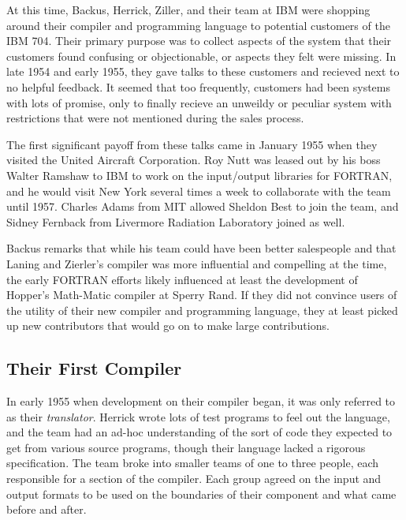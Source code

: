 At this time, Backus, Herrick, Ziller, and their team at IBM were shopping around
their compiler and programming language to potential customers of the IBM 704.
Their primary purpose was to collect aspects of the system that their customers found
confusing or objectionable, or aspects they felt were missing.
In late 1954 and early 1955, they gave talks to these customers and recieved next to
no helpful feedback.
It seemed that too frequently, customers had been systems with lots of promise, only to
finally recieve an unweildy or peculiar system with restrictions that were not mentioned
during the sales process.

The first significant payoff from these talks came in January 1955 when they visited the
United Aircraft Corporation. Roy Nutt was leased out by his boss Walter Ramshaw
to IBM to work on the input/output
libraries for FORTRAN, and he would visit New York several times a week to collaborate with
the team until 1957.
Charles Adams from MIT allowed Sheldon Best to join the team,
and Sidney Fernback from Livermore Radiation Laboratory joined as well.

Backus remarks that while his team could have been better salespeople and that
Laning and Zierler's compiler was more influential and compelling at the time, the early FORTRAN efforts
likely influenced at least the development of Hopper's Math-Matic compiler at
Sperry Rand.
If they did not convince users of the utility of their new compiler and programming language,
they at least picked up new contributors that would go on to make large contributions.

\subsection{Their First Compiler}

In early 1955 when development on their compiler began, it was only referred to as their \textit{translator}.
Herrick wrote lots of test programs to feel out the language, and the team had an ad-hoc understanding of the
sort of code they expected to get from various source programs, though their language lacked a
rigorous specification.
The team broke into smaller teams of one to three people, each responsible for a section of the compiler.
Each group agreed on the input and output formats to be used on the boundaries of their component and what came before and after.

